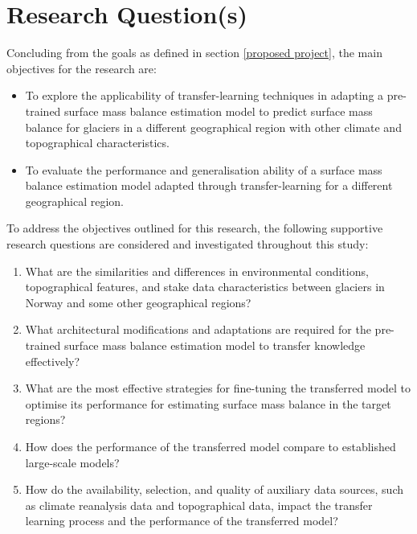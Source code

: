 \section{Research Question(s)}\label{research questions}


Concluding from the goals as defined in section \ref{proposed project}, the main objectives for the research are:
\begin{itemize}
    \item To explore the applicability of transfer-learning techniques in adapting a pre-trained surface mass balance estimation model to predict surface mass balance for glaciers in a different geographical region with other climate and topographical characteristics.
    \item To evaluate the performance and generalisation ability of a surface mass balance estimation model adapted through transfer-learning for a different geographical region.
\end{itemize}

To address the objectives outlined for this research, the following supportive research questions are considered and investigated throughout this study: 

\begin{enumerate}
    \item What are the similarities and differences in environmental conditions, topographical features, and stake data characteristics between glaciers in Norway and some other geographical regions?
    \item What architectural modifications and adaptations are required for the pre-trained surface mass balance estimation model to transfer knowledge effectively?
    \item What are the most effective strategies for fine-tuning the transferred model to optimise its performance for estimating surface mass balance in the target regions?
    \item How does the performance of the transferred model compare to established large-scale models? 
    \item How do the availability, selection, and quality of auxiliary data sources, such as climate reanalysis data and topographical data, impact the transfer learning process and the performance of the transferred model?
\end{enumerate}